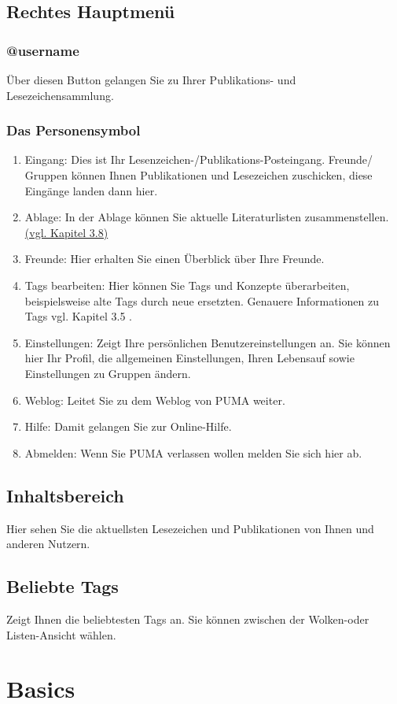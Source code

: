 \documentclass[a4paper,11pt,twoside]{scrbook}
\begin{document}
\subsection{Rechtes Hauptmenü}
\subsubsection{@username}
Über diesen Button gelangen Sie zu Ihrer Publikations- und Lesezeichensammlung. 
\subsubsection{Das Personensymbol}
\begin{enumerate}
    \item Eingang: Dies ist Ihr Lesenzeichen-/Publikations-Posteingang. Freunde/ Gruppen können Ihnen Publikationen und Lesezeichen zuschicken, diese Eingänge landen dann hier.
    \item Ablage: In der Ablage können Sie aktuelle Literaturlisten zusammenstellen. \hyperlink{Ablage}{(vgl. Kapitel 3.8)}
    \item Freunde: Hier erhalten Sie einen Überblick über Ihre Freunde. 
    \item Tags bearbeiten: Hier können Sie Tags und Konzepte überarbeiten, beispielsweise alte Tags durch neue ersetzten. Genauere Informationen zu Tags vgl. Kapitel 3.5 .
    \item Einstellungen: Zeigt Ihre persönlichen Benutzereinstellungen an. Sie können hier Ihr Profil, die allgemeinen Einstellungen, Ihren Lebensauf sowie Einstellungen zu Gruppen ändern.
    \item Weblog: Leitet Sie zu dem Weblog von PUMA weiter.
    \item Hilfe: Damit gelangen Sie zur Online-Hilfe.
    \item Abmelden: Wenn Sie PUMA verlassen wollen melden Sie sich hier ab. 
\end{enumerate}
\subsection{Inhaltsbereich}
Hier sehen Sie die aktuellsten Lesezeichen und Publikationen von Ihnen und anderen Nutzern. 
\subsection{Beliebte Tags}
Zeigt Ihnen die beliebtesten Tags an. Sie können zwischen der Wolken-oder Listen-Ansicht wählen.
\newpage
\section{Basics}
\end{document}
